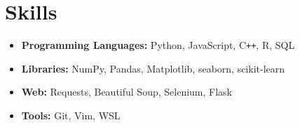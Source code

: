 \documentclass[letterpaper,11pt]{article}
\begin{document}
\section{Skills}
\begin{itemize}
    \item \textbf{Programming Languages:} 
    Python, 
    JavaScript, 
    C\texttt{++},
    R, 
    SQL
    
    \item \textbf{Libraries:} 
    NumPy, Pandas, Matplotlib, 
    seaborn, 
    scikit-learn
    
    \item \textbf{Web:} 
    Requests, 
    Beautiful Soup, 
    Selenium, 
    Flask


    \item \textbf{Tools:} 
    Git, 
    Vim, 
    WSL 

\end{itemize}



\end{document}
